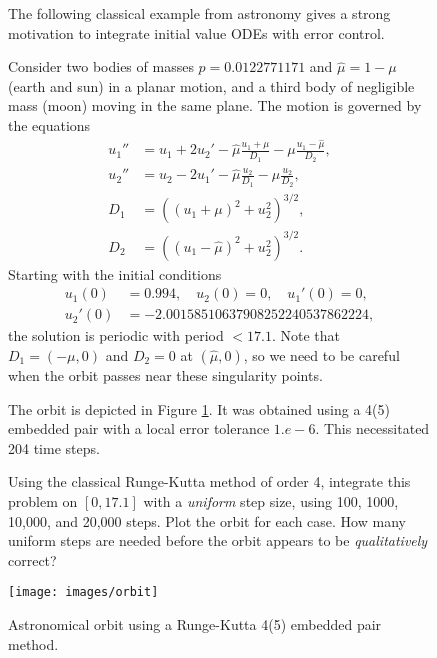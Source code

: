 \begin{figure}
  \begin{problem}[A\&P 4.12]
    The following classical example from astronomy gives a strong motivation to integrate initial value ODEs with error control.
  
    Consider two bodies of masses $p = 0.0122771171$ and $\hat{\mu}= 1 - \mu$ (earth and sun) in a planar motion, and a third body of negligible mass (moon) moving in the same plane. The motion is governed by the equations
    \begin{align*}
      u_1'' &= u_1 + 2u_2' - \hat{\mu} \frac{u_1 + \mu}{D_1} - \mu \frac{u_1 - \hat{\mu}}{D_2}, \\
      u_2'' &= u_2 - 2u_1' - \hat{\mu}\frac{u_2}{D_1} - \mu\frac{u_2}{D_2}, \\
      D_1 &= ((u_1 + \mu)^2 + u_2^2)^{3/2}, \\
      D_2 &= ((u_1 - \hat{\mu})^2 + u_2^2)^{3/2}.
    \end{align*}
    Starting with the initial conditions
    \begin{align*}
      u_1(0) &= 0.994, \quad u_2(0) = 0, \quad u_1'(0) = 0, \\
      u_2'(0) &= -2.00158510637908252240537862224,
    \end{align*}
    the solution is periodic with period $< 17.1$. Note that $D_1 = (-\mu, 0)$ and $D_2 = 0$ at $(\hat{\mu},0)$, so we need to be careful when the orbit passes near these singularity points.
  
    The orbit is depicted in Figure \ref{F:orbit}. It was obtained using a 4(5) embedded pair with a local error tolerance $1.e - 6$. This necessitated 204 time steps.
  
    Using the classical Runge-Kutta method of order 4, integrate this problem on $[0,17.1]$ with a \emph{uniform} step size, using 100, 1000, 10,000, and 20,000 steps. Plot the orbit for each case. How many uniform steps are needed before the orbit appears to be \emph{qualitatively} correct?
    
    \centering
    \texttt{[image: images/orbit]}
    \caption{Astronomical orbit using a Runge-Kutta 4(5) embedded pair method.}
    \label{F:orbit}
  \end{problem}
\end{figure}

\FloatBarrier

\begin{solution}
  
\end{solution}